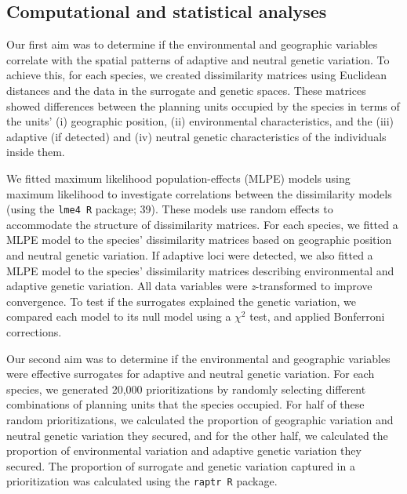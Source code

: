 \documentclass[9pt,twocolumn,twoside,lineno]{pnas-new}
\begin{document}
\subsection*{Computational and statistical
analyses}\label{statistical-analyses}

Our first aim was to determine if the environmental and geographic
variables correlate with the spatial patterns of adaptive and neutral
genetic variation. To achieve this, for each species, we created
dissimilarity matrices using Euclidean distances and the data in the
surrogate and genetic spaces. These matrices showed differences between
the planning units occupied by the species in terms of the units' (i)
geographic position, (ii) environmental characteristics, and the (iii)
adaptive (if detected) and (iv) neutral genetic characteristics of the
individuals inside them.

We fitted maximum likelihood population-effects (MLPE) models using
maximum likelihood to investigate correlations between the dissimilarity
models (using the \texttt{lme4 R} package; 39). These models use random
effects to accommodate the structure of dissimilarity matrices. For each
species, we fitted a MLPE model to the species' dissimilarity matrices
based on geographic position and neutral genetic variation. If adaptive
loci were detected, we also fitted a MLPE model to the species'
dissimilarity matrices describing environmental and adaptive genetic
variation. All data variables were \emph{z}-transformed to improve
convergence. To test if the surrogates explained the genetic variation,
we compared each model to its null model using a \(\chi^2\) test, and
applied Bonferroni corrections.

Our second aim was to determine if the environmental and geographic
variables were effective surrogates for adaptive and neutral genetic
variation. For each species, we generated 20,000 prioritizations by
randomly selecting different combinations of planning units that the
species occupied. For half of these random prioritizations, we
calculated the proportion of geographic variation and neutral genetic
variation they secured, and for the other half, we calculated the
proportion of environmental variation and adaptive genetic variation
they secured. The proportion of surrogate and genetic variation captured
in a prioritization was calculated using the \texttt{raptr R} package.
\end{document}
